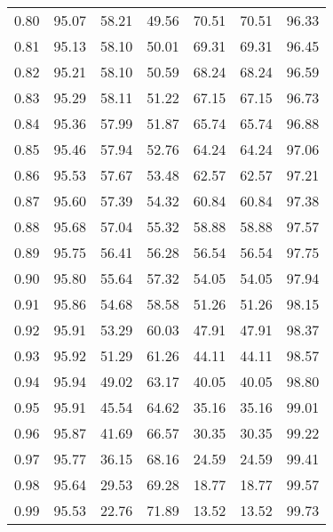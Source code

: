 \begin{tabular}{|c|c|c|c|c|c|c|}
      0.80 &     95.07 &     58.21 &      49.56 &   70.51 &      70.51 &         96.33 \\
      0.81 &     95.13 &     58.10 &      50.01 &   69.31 &      69.31 &         96.45 \\
      0.82 &     95.21 &     58.10 &      50.59 &   68.24 &      68.24 &         96.59 \\
      0.83 &     95.29 &     58.11 &      51.22 &   67.15 &      67.15 &         96.73 \\
      0.84 &     95.36 &     57.99 &      51.87 &   65.74 &      65.74 &         96.88 \\
      0.85 &     95.46 &     57.94 &      52.76 &   64.24 &      64.24 &         97.06 \\
      0.86 &     95.53 &     57.67 &      53.48 &   62.57 &      62.57 &         97.21 \\
      0.87 &     95.60 &     57.39 &      54.32 &   60.84 &      60.84 &         97.38 \\
      0.88 &     95.68 &     57.04 &      55.32 &   58.88 &      58.88 &         97.57 \\
      0.89 &     95.75 &     56.41 &      56.28 &   56.54 &      56.54 &         97.75 \\
      0.90 &     95.80 &     55.64 &      57.32 &   54.05 &      54.05 &         97.94 \\
      0.91 &     95.86 &     54.68 &      58.58 &   51.26 &      51.26 &         98.15 \\
      0.92 &     95.91 &     53.29 &      60.03 &   47.91 &      47.91 &         98.37 \\
      0.93 &     95.92 &     51.29 &      61.26 &   44.11 &      44.11 &         98.57 \\
      0.94 &     95.94 &     49.02 &      63.17 &   40.05 &      40.05 &         98.80 \\
      0.95 &     95.91 &     45.54 &      64.62 &   35.16 &      35.16 &         99.01 \\
      0.96 &     95.87 &     41.69 &      66.57 &   30.35 &      30.35 &         99.22 \\
      0.97 &     95.77 &     36.15 &      68.16 &   24.59 &      24.59 &         99.41 \\
      0.98 &     95.64 &     29.53 &      69.28 &   18.77 &      18.77 &         99.57 \\
      0.99 &     95.53 &     22.76 &      71.89 &   13.52 &      13.52 &         99.73 \\
\bottomrule
\end{tabular}
